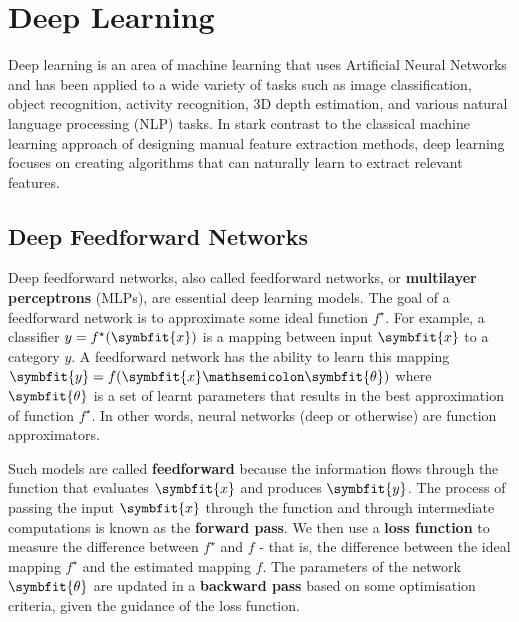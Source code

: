 \chapter{Deep Learning} \label{chap:basics-of-dl}

Deep learning is an area of machine learning that uses Artificial Neural Networks \parencite{mcculloch1943logical} and has been applied to a wide variety of tasks such as image classification, object recognition, activity recognition, 3D depth estimation, and various natural language processing (NLP) tasks. In stark contrast to the classical machine learning approach of designing manual feature extraction methods, deep learning focuses on creating algorithms that can naturally learn to extract relevant features.

\section{Deep Feedforward Networks} \label{sec:feed-forward-nets}

Deep feedforward networks, also called feedforward networks, or \textbf{multilayer perceptrons} (MLPs), are essential deep learning models. The goal of a feedforward network is to approximate some ideal function \(f^\star\). 
For example, a classifier \(y = f^\star(\symbfit{x})\) is a mapping between input $\symbfit{x}$ to a category $y$. A feedforward network has the ability to learn this mapping \(\symbfit{y} = f(\symbfit{x} \mathsemicolon \symbfit{\theta})\) where $\symbfit{\theta}$ is a set of learnt parameters that results in the best approximation of function $f^\star$. In other words, neural networks (deep or otherwise) are function approximators.

Such models are called \textbf{feedforward} because the information flows through the function that evaluates $\symbfit{x}$ and produces $\symbfit{y}$. The process of passing the input $\symbfit{x}$ through the function and through intermediate computations is known as the \textbf{forward pass}. We then use a \textbf{loss function} to measure the difference between $f^\star$ and $f$ - that is, the difference between the ideal mapping $f^\star$ and the estimated mapping $f$. The parameters of the network $\symbfit{\theta}$ are updated in a \textbf{backward pass} based on some optimisation criteria, given the guidance of the loss function. 

